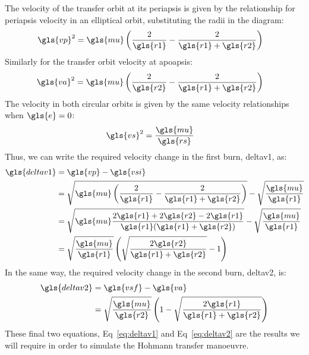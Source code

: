 \documentclass[12pt,openany]{book}
\begin{document}
The velocity of the transfer orbit at its periapsis is given by the relationship for periapsis velocity in an elliptical orbit, substituting the radii in the diagram:
\begin{align}
  \gls{vp}^2 &= \gls{mu}\left(\frac{2}{\gls{r1}}-\frac{2}{\gls{r1}+\gls{r2}}\right)
\end{align}
Similarly for the transfer orbit velocity at apoapsis:
\begin{align}
  \gls{va}^2 &= \gls{mu}\left(\frac{2}{\gls{r2}}-\frac{2}{\gls{r1}+\gls{r2}}\right)
\end{align}
The velocity in both circular orbits is given by the same velocity relationships when \(\gls{e} = 0\):
\begin{align}
  \gls{vs}^2 &= \frac{\gls{mu}}{\gls{rs}}
\end{align}
Thus, we can write the required velocity change in the first burn, \gls{deltav1}, as:
\begin{align}
  \gls{deltav1} &= \gls{vp} - \gls{vsi} \\
  &= \sqrt{\gls{mu}\left(\frac{2}{\gls{r1}}-\frac{2}{\gls{r1}+\gls{r2}}\right)}
  - \sqrt{\frac{\gls{mu}}{\gls{r1}}}\\
  &= \sqrt{
    \gls{mu}
    \frac{2\gls{r1}+2\gls{r2}-2\gls{r1}}{\gls{r1}(\gls{r1}+\gls{r2})}
    }
  - \sqrt{\frac{\gls{mu}}{\gls{r1}}}\\
  &= \sqrt{\frac{\gls{mu}}{\gls{r1}}}
  \left(
  \sqrt{\frac{2\gls{r2}}{\gls{r1}+\gls{r2}}} - 1
  \right) \label{eq:deltav1}
\end{align}
In the same way, the required velocity change in the second burn, \gls{deltav2}, is:
\begin{align}
  \gls{deltav2} &= \gls{vsf} - \gls{va} \\
  &= \sqrt{\frac{\gls{mu}}{\gls{r2}}}
  \left(
  1 - \sqrt{\frac{2\gls{r1}}{\gls{r1}+\gls{r2}}}
  \right) \label{eq:deltav2}
\end{align}
These final two equations, Eq~\ref{eq:deltav1} and Eq~\ref{eq:deltav2} are the results we will require in order to simulate the Hohmann transfer manoeuvre.

\printunsrtglossary[type=symbols,style=long]

\clearpage{}
{}


\end{document}
